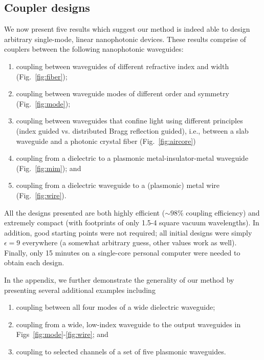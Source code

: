\documentclass[letterpaper,10pt]{article}
\begin{document}
\subsection{Coupler designs}
We now present five results which suggest our method
    is indeed able to design arbitrary single-mode, linear nanophotonic devices.
These results comprise of couplers between 
    the following nanophotonic waveguides:
    \begin{enumerate}
    \item coupling between waveguides of different refractive index and width
        (Fig.~\ref{fig:fiber});
    \item coupling between waveguide modes of different order and symmetry
        (Fig.~\ref{fig:mode});
    \item coupling between waveguides that confine light 
        using different principles 
        (index guided vs. distributed Bragg reflection guided), 
        i.e., between a slab waveguide and a photonic crystal fiber
        (Fig.~\ref{fig:aircore})
    \item coupling from a dielectric to a plasmonic metal-insulator-metal 
        waveguide (Fig.~\ref{fig:mim}); and
    \item coupling from a dielectric waveguide to a (plasmonic) metal wire
        (Fig.~\ref{fig:wire}).
    \end{enumerate}
All the designs presented are both highly efficient 
    ($\sim 98\%$ coupling efficiency)
    and extremely compact 
    (with footprints of only 1.5-4 square vacuum wavelengths).
In addition, good starting points were not required; 
    all initial designs were simply $\epsilon = 9$ everywhere
    (a somewhat arbitrary guess, other values work as well).
Finally, only 15 minutes on a single-core personal computer
    were needed to obtain each design.

In the appendix, we further demonstrate the generality of our method
    by presenting several additional examples including
    \begin{enumerate}
    \item coupling between all four modes of a wide dielectric waveguide;
    \item coupling from a wide, low-index waveguide to the output waveguides in 
        Figs~\ref{fig:mode}-\ref{fig:wire}; and
    \item coupling to selected channels of a set of five plasmonic waveguides.
    \end{enumerate}
\end{document}

